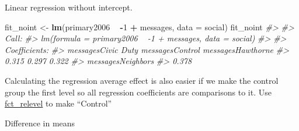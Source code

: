 \documentclass[]{book}
\newenvironment{Shaded}{\begin{snugshade}}{\end{snugshade}}
\newcommand{\KeywordTok}[1]{\textcolor[rgb]{0.13,0.29,0.53}{\textbf{#1}}}
\newcommand{\DataTypeTok}[1]{\textcolor[rgb]{0.13,0.29,0.53}{#1}}
\newcommand{\DecValTok}[1]{\textcolor[rgb]{0.00,0.00,0.81}{#1}}
\newcommand{\StringTok}[1]{\textcolor[rgb]{0.31,0.60,0.02}{#1}}
\newcommand{\CommentTok}[1]{\textcolor[rgb]{0.56,0.35,0.01}{\textit{#1}}}
\newcommand{\OperatorTok}[1]{\textcolor[rgb]{0.81,0.36,0.00}{\textbf{#1}}}
\newcommand{\NormalTok}[1]{#1}
\theoremstyle{definition}
\theoremstyle{definition}
\theoremstyle{definition}
\theoremstyle{remark}
\begin{document}
Linear regression without intercept.

\begin{Shaded}
\begin{Highlighting}[]
\NormalTok{fit_noint <-}\StringTok{ }\KeywordTok{lm}\NormalTok{(primary2006 }\OperatorTok{~}\StringTok{ }\OperatorTok{-}\DecValTok{1} \OperatorTok{+}\StringTok{ }\NormalTok{messages, }\DataTypeTok{data =}\NormalTok{ social)}
\NormalTok{fit_noint}
\CommentTok{#> }
\CommentTok{#> Call:}
\CommentTok{#> lm(formula = primary2006 ~ -1 + messages, data = social)}
\CommentTok{#> }
\CommentTok{#> Coefficients:}
\CommentTok{#> messagesCivic Duty     messagesControl   messagesHawthorne  }
\CommentTok{#>              0.315               0.297               0.322  }
\CommentTok{#>  messagesNeighbors  }
\CommentTok{#>              0.378}
\end{Highlighting}
\end{Shaded}

Calculating the regression average effect is also easier if we make the
control group the first level so all regression coefficients are
comparisons to it. Use
\href{https://www.rdocumentation.org/packages/forcats/topics/fct_relevel}{fct\_relevel}
to make ``Control''

\begin{Shaded}
\end{Shaded}

Difference in means
\end{document}

